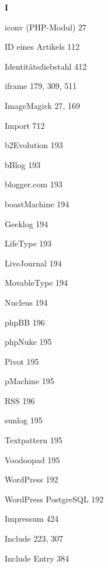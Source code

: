 \documentclass{book}
\renewcommand\indexspace{\vspace{11pt}}
\renewcommand\subitem{\par}
\begin{document}
\begin{multicols}{2}
\begin{osp-index}
  \indexspace
{\sffamily\bfseries I}\nopagebreak

  \item iconv (PHP-Modul)\hspace{1mm} 27
  \item ID eines Artikels\hspace{1mm} 112
  \item Identit\"atsdiebstahl\hspace{1mm} 412
  \item iframe\hspace{1mm} 179, 309, 511
  \item ImageMagick\hspace{1mm} 27, 169
  \item Import\hspace{1mm} 712
    \subitem b2Evolution\hspace{1mm} 193
    \subitem bBlog\hspace{1mm} 193
    \subitem blogger.com\hspace{1mm} 193
    \subitem boastMachine\hspace{1mm} 194
    \subitem Geeklog\hspace{1mm} 194
    \subitem LifeType\hspace{1mm} 193
    \subitem LiveJournal\hspace{1mm} 194
    \subitem MovableType\hspace{1mm} 194
    \subitem Nucleus\hspace{1mm} 194
    \subitem phpBB\hspace{1mm} 196
    \subitem phpNuke\hspace{1mm} 195
    \subitem Pivot\hspace{1mm} 195
    \subitem pMachine\hspace{1mm} 195
    \subitem RSS\hspace{1mm} 196
    \subitem sunlog\hspace{1mm} 195
    \subitem Textpattern\hspace{1mm} 195
    \subitem Voodoopad\hspace{1mm} 195
    \subitem WordPress\hspace{1mm} 192
    \subitem WordPress PostgreSQL\hspace{1mm} 192
  \item Impressum\hspace{1mm} 424
  \item Include\hspace{1mm} 223, 307
  \item Include Entry\hspace{1mm} 384

\end{osp-index}
\end{multicols}
\end{document}
